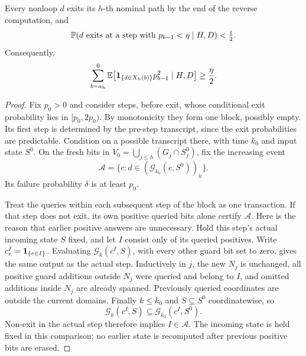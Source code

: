 \begin{lemma}\label{lem:exit}
Every nonloop $d$ exits its $h$-th nominal path by the end of the reverse
computation, and
\begin{equation}\label{eq:low-exit-hazard}
 \mathbb P(\text{$d$ exits at a step with }p_{b-1}<\eta\mid H,D)<\tfrac12.
\end{equation}
Consequently,
\begin{equation}\label{eq:squared-exit-mass}
 \sum_{b=a_h}^{0}
  \mathbb E\bigl[\mathbf 1_{\{d\in X_h(b)\}}p_{b-1}^{2}\mid H,D\bigr]
       \ge\frac{\eta}{2}.
\end{equation}
\end{lemma}
\begin{proof}
Fix $p_0>0$ and consider steps, before exit, whose conditional exit
probability lies in $[p_0,2p_0)$. By monotonicity they form one block,
possibly empty. Its first step is determined by the pre-step transcript,
since the exit probabilities are predictable. Condition on a possible
transcript there, with time $k_0$ and input state $S^0$. On the fresh bits
in $V_0=\bigcup_{j\le h}(G_j\cap S^0_j)$, fix the increasing event
\[
 \mathcal A=
 \{c:d\in(\mathcal G_{k_0}(c,S^0))_h\}.
\]
Its failure probability $\delta$ is at least $p_0$.

Treat the queries within each subsequent step of the block as one
transaction. If that step does not exit, its own positive queried bits
alone certify $\mathcal A$. Here is the reason that earlier positive
answers are unnecessary. Hold this step's actual incoming state $S$
fixed, and let $I$ consist only of its queried positives. Write
$c^I_e=\mathbf 1_{\{e\in I\}}$. Evaluating $\mathcal G_k(c^I,S)$, with every
other guard bit set to zero, gives
the same output as the actual step. Inductively in $j$, the new $N_j$ is
unchanged, all positive guard additions outside $N_j$ were queried and
belong to $I$, and omitted additions inside $N_j$ are already spanned.
Previously queried coordinates are outside the current domains.
Finally $k\le k_0$ and $S\subseteq S^0$ coordinatewise, so
\[
 \mathcal G_k(c^I,S)
       \subseteq\mathcal G_{k_0}(c^I,S^0).
\]
Non-exit in the actual step therefore implies $I\in\mathcal A$.
The incoming state is held fixed in this comparison; no earlier state
is recomputed after previous positive bits are erased.


\end{proof}
